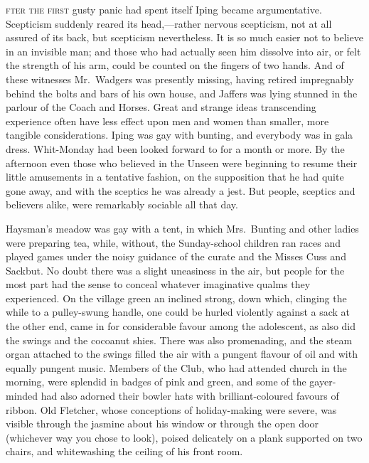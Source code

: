\label{ch:10}
\begin{ChapterStart}
\vspace*{2\nbs}

\vspace{1.5\nbs}
\vspace{0.75\nbs}
\end{ChapterStart}

\kern-3pt\textsc{fter the first} gusty panic had spent itself Iping became argumentative. Scepticism suddenly reared its head,—rather nervous scepticism, not at all assured of its back, but scepticism nevertheless. It is so much easier not to believe in an invisible man; and those who had actually seen him dissolve into air, or felt the strength of his arm, could be counted on the fingers of two hands. And of these witnesses Mr.\ Wadgers was presently missing, having retired impregnably behind the bolts and bars of his own house, and Jaffers was lying stunned in the parlour of the Coach and Horses. Great and strange ideas transcending experience often have less effect upon men and women than smaller, more tangible considerations. Iping was gay with bunting, and everybody was in gala dress. Whit-Monday had been looked forward to for a month or more. By the afternoon even those who believed in the Unseen were beginning to resume their little amusements in a tentative fashion, on the supposition that he had quite gone away, and with the sceptics he was already a jest. But people, sceptics and believers alike, were remarkably sociable all that day.

Haysman’s meadow was gay with a tent, in which Mrs.\ Bunting and other ladies were preparing tea, while, without, the Sunday-school children ran races and played games under the noisy guidance of the curate and the Misses Cuss and Sackbut. No doubt there was a slight uneasiness in the air, but people for the most part had the sense to conceal whatever imaginative qualms they experienced. On the village green an inclined strong, down which, clinging the while to a pulley-swung handle, one could be hurled violently against a sack at the other end, came in for considerable favour among the adolescent, as also did the swings and the cocoanut shies. There was also promenading, and the steam organ attached to the swings filled the air with a pungent flavour of oil and with equally pungent music. Members of the Club, who had attended church in the morning, were splendid in badges of pink and green, and some of the gayer-minded had also adorned their bowler hats with brilliant-coloured favours of ribbon. Old Fletcher, whose conceptions of holiday-making were severe, was visible through the jasmine about his window or through the open door (whichever way you chose to look), poised delicately on a plank supported on two chairs, and whitewashing the ceiling of his front room.

